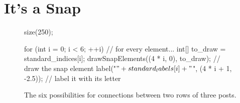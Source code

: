 \documentclass[../gatm.tex]{subfiles}
\begin{document}
\section{It's a Snap}

\newcommand\snap{\bullet} %

\begin{figure}[h]
	\begin{center}
		\begin{asy}
			size(250);

			for (int i = 0; i < 6; ++i) { // for every element...
				int[] to_draw = {standard_indices[i]};
				drawSnapElements((4 * i, 0), to_draw); // draw the snap element
				label("$" + standard_labels[i] + "$", (4 * i + 1, -2.5)); // label it with its letter
			}
		\end{asy}

		\caption{The six possibilities for connections between two rows of three posts.}
		\label{fig:all_3_cols}
	\end{center}
\end{figure}
\end{document}
